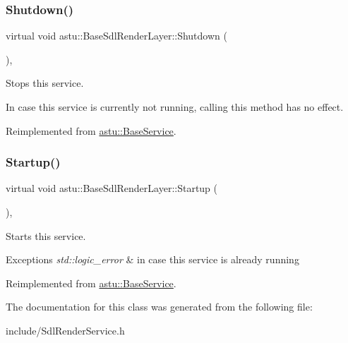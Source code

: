 \mbox{\label{classastu_1_1BaseSdlRenderLayer_a786ae49f41873d498ae0d22a0f3a5349}} 
\subsubsection{\texorpdfstring{Shutdown()}{Shutdown()}}
{\footnotesize\ttfamily virtual void astu\+::\+Base\+Sdl\+Render\+Layer\+::\+Shutdown (\begin{DoxyParamCaption}{ }\end{DoxyParamCaption})\hspace{0.3cm}{\ttfamily [override]}, {\ttfamily [virtual]}}

Stops this service.

In case this service is currently not running, calling this method has no effect. 

Reimplemented from \hyperlink{classastu_1_1BaseService_a7095888244052db294d58738c0d187fb}{astu\+::\+Base\+Service}.

\mbox{\label{classastu_1_1BaseSdlRenderLayer_a0f4fbd9bbd5613589a8f1ce39d8b6340}} 
\subsubsection{\texorpdfstring{Startup()}{Startup()}}
{\footnotesize\ttfamily virtual void astu\+::\+Base\+Sdl\+Render\+Layer\+::\+Startup (\begin{DoxyParamCaption}{ }\end{DoxyParamCaption})\hspace{0.3cm}{\ttfamily [override]}, {\ttfamily [virtual]}}

Starts this service.


\begin{DoxyExceptions}{Exceptions}
{\em std\+::logic\+\_\+error} & in case this service is already running \\
\hline
\end{DoxyExceptions}


Reimplemented from \hyperlink{classastu_1_1BaseService_a59dade033dcb44dd32155c526a3a58e2}{astu\+::\+Base\+Service}.



The documentation for this class was generated from the following file\+:\begin{DoxyCompactItemize}
\item 
include/Sdl\+Render\+Service.\+h\end{DoxyCompactItemize}
